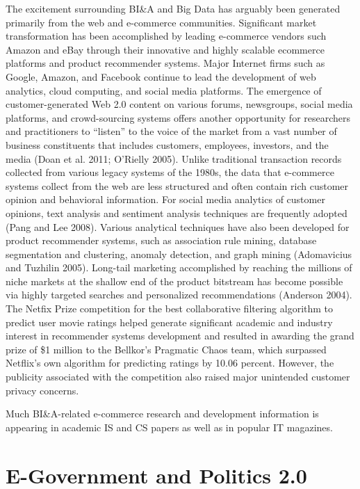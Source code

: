 The excitement surrounding BI\&A and Big Data has arguably
been generated primarily from the web and e-commerce
communities. Significant market transformation has been
accomplished by leading e-commerce vendors such Amazon
and eBay through their innovative and highly scalable ecommerce
platforms and product recommender systems.
Major Internet firms such as Google, Amazon, and Facebook
continue to lead the development of web analytics, cloud
computing, and social media platforms. The emergence of
customer-generated Web 2.0 content on various forums,
newsgroups, social media platforms, and crowd-sourcing
systems offers another opportunity for researchers and practitioners to “listen” to the voice of the market from a vast
number of business constituents that includes customers, employees,
investors, and the media (Doan et al. 2011; O’Rielly
2005). Unlike traditional transaction records collected from
various legacy systems of the 1980s, the data that e-commerce
systems collect from the web are less structured and often
contain rich customer opinion and behavioral information.
For social media analytics of customer opinions, text analysis
and sentiment analysis techniques are frequently adopted
(Pang and Lee 2008). Various analytical techniques have also
been developed for product recommender systems, such as
association rule mining, database segmentation and clustering,
anomaly detection, and graph mining (Adomavicius and
Tuzhilin 2005). Long-tail marketing accomplished by
reaching the millions of niche markets at the shallow end of
the product bitstream has become possible via highly targeted
searches and personalized recommendations (Anderson
2004).
The Netfix Prize competition for the best collaborative
filtering algorithm to predict user movie ratings helped generate
significant academic and industry interest in recommender
systems development and resulted in awarding the grand prize
of \$1 million to the Bellkor’s Pragmatic Chaos team, which
surpassed Netflix’s own algorithm for predicting ratings by
10.06 percent. However, the publicity associated with the
competition also raised major unintended customer privacy
concerns.

Much BI\&A-related e-commerce research and development
information is appearing in academic IS and CS papers as
well as in popular IT magazines.

\section*{E-Government and Politics 2.0}

